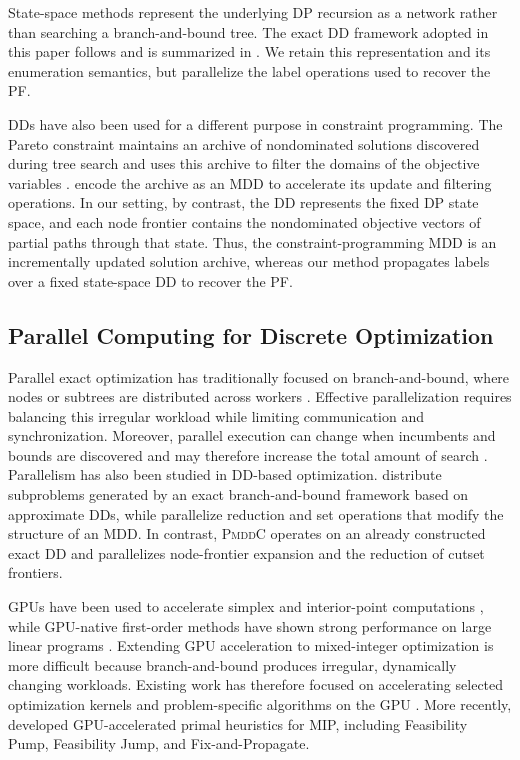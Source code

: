 \documentclass[letterpaper]{article}
\begin{document}
State-space methods represent the underlying DP recursion as a network rather than searching a branch-and-bound tree. The exact DD framework adopted in this paper follows \citet{bergman2016multiobjective,bergman2022network} and is summarized in . We retain this representation and its enumeration semantics, but parallelize the label operations used to recover the PF.

DDs have also been used for a different purpose in constraint programming. The Pareto constraint maintains an archive of nondominated solutions discovered during tree search and uses this archive to filter the domains of the objective variables \citep{hartert2014pareto}. \citet{malalel2023mdd} encode the archive as an MDD to accelerate its update and filtering operations. In our setting, by contrast, the DD represents the fixed DP state space, and each node frontier contains the nondominated objective vectors of partial paths through that state. Thus, the constraint-programming MDD is an incrementally updated solution archive, whereas our method propagates labels over a fixed state-space DD to recover the PF.


\subsection{Parallel Computing for Discrete Optimization}

Parallel exact optimization has traditionally focused on branch-and-bound, where nodes or subtrees are distributed across workers \citep{kindervater1986introduction,gendron1994parallel,ralphs2003parallel,linderoth2003decomposition}. Effective parallelization requires balancing this irregular workload while limiting communication and synchronization. Moreover, parallel execution can change when incumbents and bounds are discovered and may therefore increase the total amount of search \citep{lai1984anomalies}. Parallelism has also been studied in DD-based optimization. \citet{bergman2014parallel} distribute subproblems generated by an exact branch-and-bound framework based on approximate DDs, while \citet{perez2018parallel} parallelize reduction and set operations that modify the structure of an MDD. In contrast, \textsc{PmddC} operates on an already constructed exact DD and parallelizes node-frontier expansion and the reduction of cutset frontiers.

GPUs have been used to accelerate simplex and interior-point computations \citep{lalami2011gpu,ploskas2016gpu,shin2025madipm}, while GPU-native first-order methods have shown strong performance on large linear programs \citep{applegate2021practical,lu2025cupdlp,lu2023cupdlpc,lu2025cupdlpx}. Extending GPU acceleration to mixed-integer optimization is more difficult because branch-and-bound produces irregular, dynamically changing workloads. Existing work has therefore focused on accelerating selected optimization kernels and problem-specific algorithms on the GPU \citep{boyer2017gpu}. More recently, \citet{ccorduk2025gpu} developed GPU-accelerated primal heuristics for MIP, including Feasibility Pump, Feasibility Jump, and Fix-and-Propagate.
\end{document}
